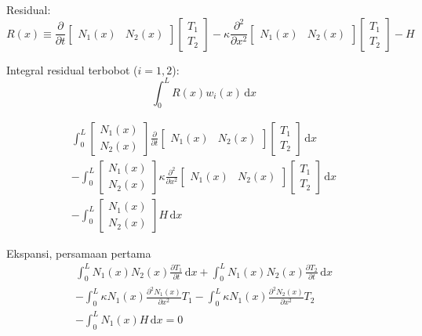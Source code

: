 Residual:
\begin{equation*}
R(x) \equiv
\frac{\partial}{\partial t} \begin{bmatrix}
N_{1}(x) & N_{2}(x) \end{bmatrix} \begin{bmatrix} T_{1} \\ T_{2} \end{bmatrix} -
\kappa \frac{\partial^2}{\partial x^2} \begin{bmatrix}
N_{1}(x) & N_{2}(x) \end{bmatrix} \begin{bmatrix} T_{1} \\ T_{2} \end{bmatrix} - H
\end{equation*}

Integral residual terbobot ($i=1,2$):
\begin{equation}
\int_{0}^{L} R(x) w_{i}(x) \, \mathrm{d}x
\end{equation}

\begin{align*}
\int_{0}^{L} \begin{bmatrix} N_{1}(x) \\ N_{2}(x) \end{bmatrix}
\frac{\partial}{\partial t}
\begin{bmatrix} N_{1}(x) & N_{2}(x) \end{bmatrix}
\begin{bmatrix} T_{1} \\ T_{2} \end{bmatrix}\,\mathrm{d}x \\
- \int_{0}^{L} \begin{bmatrix} N_{1}(x) \\ N_{2}(x) \end{bmatrix}
\kappa \frac{\partial^2}{\partial x^2}
\begin{bmatrix} N_{1}(x) & N_{2}(x) \end{bmatrix}
\begin{bmatrix} T_{1} \\ T_{2} \end{bmatrix}\,\mathrm{d}x \\
- \int_{0}^{L} \begin{bmatrix} N_{1}(x) \\ N_{2}(x) \end{bmatrix} H \, \mathrm{d}x
\end{align*}

Ekspansi, persamaan pertama
\begin{align*}
\int_{0}^{L} N_{1}(x) N_{2}(x) \frac{\partial T_1}{\partial t}\, \mathrm{d}x
+ \int_{0}^{L} N_{1}(x) N_{2}(x) \frac{\partial T_2}{\partial t}\, \mathrm{d}x \\
- \int_{0}^{L} \kappa N_{1}(x) \frac{\partial^2 N_{1}(x)}{\partial x^2} T_{1}
- \int_{0}^{L} \kappa N_{1}(x) \frac{\partial^2 N_{2}(x)}{\partial x^2} T_{2} \\
- \int_{0}^{L} N_{1}(x) H \, \mathrm{d}x = 0
\end{align*}

